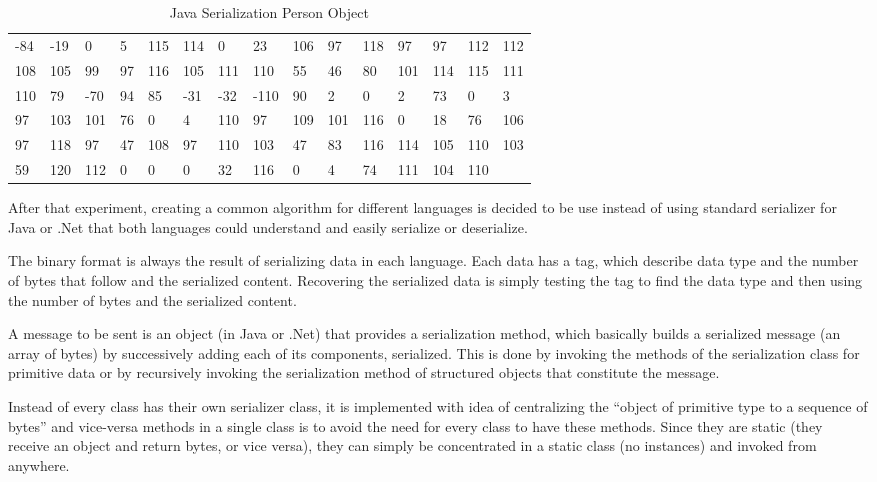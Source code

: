 \begin{table}[]
\centering
\begin{tabular}{lllllllllllllll}
  -84 & -19 & 0   & 5  & 115 & 114 & 0   & 23   & 106 & 97  & 118 & 97  & 97  & 112  & 112 \\
  108 & 105 & 99  & 97 & 116 & 105 & 111 & 110  & 55  & 46  & 80  & 101 & 114 & 115  & 111 \\
  110 & 79  & -70 & 94 & 85  & -31 & -32 & -110 & 90  & 2   & 0   & 2   & 73  & 0    & 3 \\
  97  & 103 & 101 & 76 & 0   & 4   & 110 & 97   & 109 & 101 & 116 & 0   & 18  & 76   & 106 \\
  97  & 118 & 97  & 47 & 108 & 97  & 110 & 103  & 47  & 83  & 116 & 114 & 105 & 110  & 103 \\
  59  & 120 & 112 & 0  & 0   & 0   & 32  & 116  & 0   & 4   & 74  & 111 & 104 & 110  &     \\
\end{tabular}
\caption[Java Serialization Person Object]{Java Serialization Person Object}
\label{tab:javaserilazitaon}
\end{table}

After that experiment, creating a common algorithm for different languages is decided to be use instead of using standard serializer for Java or .Net that both languages could understand and easily serialize or deserialize.

The binary format is always the result of serializing data in each language. Each data has a tag, which describe data type and the number of bytes that follow and the serialized content. Recovering the serialized data is simply testing the tag to find the data type and then using the number of bytes and the serialized content.

A message to be sent is an object (in Java or .Net) that provides a serialization method, which basically builds a serialized message (an array of bytes) by successively  adding each of its components, serialized. This is done by invoking the methods of the serialization class for primitive data or by recursively invoking the serialization method of structured objects that constitute the message.

Instead of every class has their own serializer class, it is implemented with idea of centralizing the “object of primitive type to a sequence of bytes” and vice-versa methods in a single class is to avoid the need for every class to have these methods. Since they are static (they receive an object and return bytes, or vice versa), they can simply be concentrated in a static class (no instances) and invoked from anywhere.


